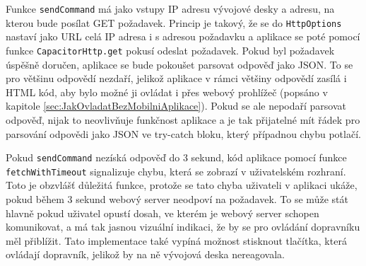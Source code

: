 Funkce \texttt{sendCommand} má jako vstupy IP adresu vývojové desky a adresu, na kterou bude posílat GET požadavek. Princip je takový, že se do \texttt{HttpOptions} nastaví jako URL celá IP adresa i s adresou požadavku a aplikace se poté pomocí funkce \texttt{CapacitorHttp.get} pokusí odeslat požadavek. Pokud byl požadavek úspěšně doručen, aplikace se bude pokoušet parsovat odpověď jako JSON. To se pro většinu odpovědí nezdaří, jelikož aplikace v rámci většiny odpovědí zasílá i HTML kód, aby bylo možné ji ovládat i přes webový prohlížeč (popsáno v kapitole \ref{sec:JakOvladatBezMobilniAplikace}). Pokud se ale nepodaří parsovat odpověď, nijak to neovlivňuje funkčnost aplikace a je tak přijatelné mít řádek pro parsování odpovědi jako JSON ve try-catch bloku, který případnou chybu potlačí.

Pokud \texttt{sendCommand} nezíská odpověď do 3 sekund, kód aplikace pomocí funkce \texttt{fetch\-With\-Time\-out} signalizuje chybu, která se zobrazí v uživatelském rozhraní. Toto je obzvlášť důležitá funkce, protože se tato chyba uživateli v aplikaci ukáže, pokud během 3 sekund webový server neodpoví na požadavek. To se může stát hlavně pokud uživatel opustí dosah, ve kterém je webový server schopen komunikovat, a má tak jasnou vizuální indikaci, že by se pro ovládání dopravníku měl přiblížit. Tato implementace také vypíná možnost stisknout tlačítka, která ovládají dopravník, jelikož by na ně vývojová deska nereagovala.

